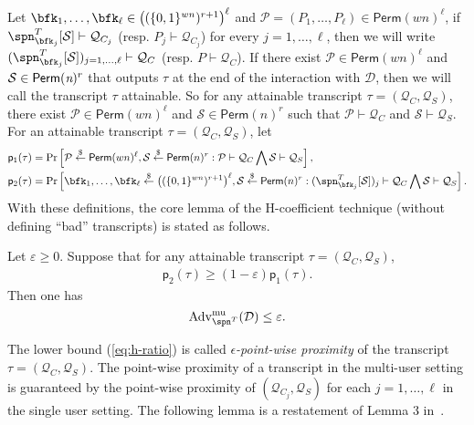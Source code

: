 Let $\bfk_1, \ldots ,\bfk_{\ell} \in \big((\{0,1\}^{wn})^{r+1}\big)^{\ell}$ and ${\mathcal{P}} = ({P}_1, \ldots ,{P}_\ell) \in {\mathsf{Perm}}(wn)^\ell$, if $\spn_{\bfk_j}^T[\mathcal{S}]\vdash\mathcal{Q}_{C_j}$ (resp. ${P}_j\vdash\mathcal{Q}_{C_j}$) for every $j = 1, \ldots ,\ell$, then we will write $(\spn_{\bfk_j}^{T}[\mathcal{S}])_{j = 1, \ldots ,\ell} \vdash \mathcal{Q}_C$ (resp. ${P}\vdash\mathcal{Q}_{C}$).
%
If there exist ${\mathcal{P}} \in {\mathsf{Perm}}(wn)^\ell$ and $\mathcal{S} \in \mathsf{Perm}(\emph{n})^r$ that outputs $\tau$ at the end of the interaction with $\mathcal{D}$, then we will call the transcript $\tau$ attainable. So for any attainable transcript $\tau= (\mathcal{Q}_C,\mathcal{Q}_S)$, there exist ${\mathcal{P}} \in {\mathsf{Perm}}(wn)^\ell$ and $\mathcal{S} \in \mathsf{Perm}(n)^r$ such that ${\mathcal{P}}\vdash\mathcal{Q}_C$ and $\mathcal{S}\vdash\mathcal{Q}_S$. For an attainable transcript $\tau = (\mathcal{Q}_C,\mathcal{Q}_S)$, let
%
%
$$
\begin{aligned}
&\mathsf{p}_{1}(\tau)=\operatorname{Pr}\left[{\mathcal{P}} \stackrel{\$}{\leftarrow} {{\mathsf{Perm}}}(wn)^{\ell}, \mathcal{S} \stackrel{\$}{\leftarrow} \mathsf{Perm}(n)^{r}: {\mathcal{P}} \vdash \mathcal{Q}_{C} \bigwedge \mathcal{S} \vdash \mathcal{Q}_{S}\right],\\
&\mathsf{p}_{2}(\tau)=\operatorname{Pr}\left[\bfk_{1}, \ldots, \bfk_{\ell} \stackrel{\$}{\leftarrow} \big((\{0,1\}^{wn})^{r+1}\big)^{\ell}, \mathcal{S} \stackrel{\$}{\leftarrow} \mathsf{Perm}(n)^{r}:(\spn_{\bfk_{j}}^{T}[\mathcal{S}])_{j} \vdash \mathcal{Q}_{C} \bigwedge \mathcal{S} \vdash \mathcal{Q}_{S}\right].
\end{aligned}
$$
%
%
With these definitions, the core lemma of the H-coefficient technique (without defining ``bad'' transcripts) is stated as follows.


\begin{lemma}
	\label{lemma:h-coeff}
	
	Let $\varepsilon \geq 0$. Suppose that for any attainable transcript $\tau = (\mathcal{Q}_C,\mathcal{Q}_S)$,
	\begin{align}
	\mathsf{p}_{2}(\tau) \geq (1 - \varepsilon) \mathsf{p}_{1}(\tau).
	\label{eq:h-ratio}
	\end{align}
	Then one has
	$$
	\operatorname{Adv}^{\mathrm{mu}}_{\spn^T}(\mathcal{D}) \leq \varepsilon.
	$$
\end{lemma}
%
%
The lower bound (\ref{eq:h-ratio}) is called \emph{$\epsilon$-point-wise proximity} of the transcript $\tau = (\mathcal{Q}_C, \mathcal{Q}_S)$. The point-wise proximity of a transcript in the multi-user setting is guaranteed by the point-wise proximity of $(\mathcal{Q}_{C_{j}}, \mathcal{Q}_S)$ for each $j = 1, \ldots ,\ell$ in the single user setting. The following lemma is a restatement of Lemma 3 in~\cite{C:HoaTes16}.


